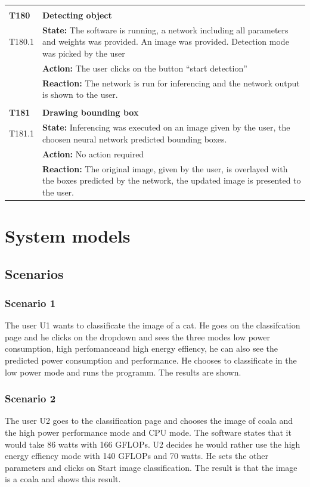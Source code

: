 \documentclass[parskip=full]{scrartcl}
\begin{document}
\begin{tabular}{p{2cm}p{12cm}}
& \\
\textbf{T180} & \textbf{Detecting object}\\
T180.1 & \textbf{State:} The software is running, a network including all parameters and weights was provided. An image was provided. Detection mode was picked by the user\\
& \textbf{Action:} The user clicks on the button ``start detection''\\
& \textbf{Reaction:} The network is run for inferencing and the network output is shown to the user.\\

& \\
\textbf{T181} & \textbf{Drawing bounding box}\\
T181.1 & \textbf{State:} Inferencing was executed on an image given by the user, the choosen neural network predicted bounding boxes.\\
& \textbf{Action:} No action required\\
& \textbf{Reaction:} The original image, given by the user, is overlayed with the boxes predicted by the network, the updated image is presented to the user.\\

\end{tabular}
\newpage
\section{System models}

\subsection{Scenarios}
\subsubsection{Scenario 1}
The user U1 wants to classificate the image of a cat. He goes on the classifcation page and he clicks on the dropdown and sees the three modes \glqq low power consumption\grqq , \glqq high perfomance\grqq and \glqq high energy effiency\grqq , he can also see the predicted power consumption and performance. He chooses to classificate in the low power mode and runs the programm. The results are shown.
\subsubsection{Scenario 2}
The user U2 goes to the classification page and chooses the image of coala and the high power performance mode and CPU mode. The software states that it would take 86 watts with 166 GFLOPs. U2 decides he would rather use the high energy effiency mode with 140 GFLOPs and 70 watts. He sets the other parameters and clicks on Start image classification. The result is that the image is a coala and shows this result. 
\end{document}
